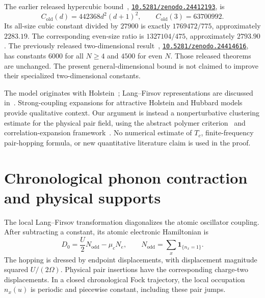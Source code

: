 \documentclass[11pt]{article}
\newcommand{\DOI}[1]{\mbox{\href{https://doi.org/#1}{\nolinkurl{#1}}}}
\theoremstyle{plain}
\theoremstyle{remark}
\newcommand{\Nodd}{N_{\mathrm{odd}}}
\begin{document}
The earlier released hypercubic bound~\cite{rensCubic},
\DOI{10.5281/zenodo.24412193}, is
\[
C_{\mathrm{old}}(d)=442368d^2(d+1)^2,
\qquad C_{\mathrm{old}}(3)=63700992.
\]
Its all-size cubic constant divided by $27900$ is exactly $1769472/775$,
approximately $2283.19$. The corresponding even-size ratio is $1327104/475$,
approximately $2793.90$. The previously released two-dimensional
result~\cite{rensSharp}, \DOI{10.5281/zenodo.24414616}, has constants $6000$
for all $N\ge4$ and $4500$ for even $N$. Those released theorems are unchanged.
The present general-dimensional bound is not claimed to improve their
specialized two-dimensional constants.

The model originates with Holstein~\cite{holstein1959}; Lang--Firsov
representations are discussed in~\cite{hohenadler2007}. Strong-coupling
expansions for attractive Holstein and Hubbard models~\cite{freericks1993}
provide qualitative context. Our argument is instead a nonperturbative
clustering estimate for the physical pair field, using the abstract polymer
criterion~\cite{kotecky1986} and correlation-expansion framework~\cite{uelschi2004}.
No numerical estimate of $T_c$, finite-frequency pair-hopping formula, or
new quantitative literature claim is used in the proof.

\section{Chronological phonon contraction and physical supports}\label{sec:contours}

The local Lang--Firsov transformation diagonalizes the atomic oscillator
coupling. After subtracting a constant, its atomic electronic Hamiltonian is
\begin{equation}\label{eq:atomic}
D_0=\frac{U}{2}\Nodd-\mu_c N_e,
\qquad \Nodd=\sum_x\boldsymbol{1}_{\{n_x=1\}}.
\end{equation}
The hopping is dressed by endpoint displacements, with displacement magnitude
squared $U/(2\Omega)$. Physical pair insertions have the corresponding
charge-two displacements. In a closed chronological Fock trajectory, the
local occupation $n_x(u)$ is periodic and piecewise constant, including
these pair jumps.
\end{document}
